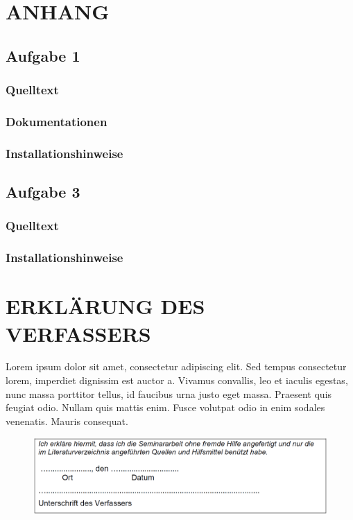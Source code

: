 \documentclass[a4paper,12pt]{article}
\begin{document}
\newpage
\section{ANHANG}
\subsection{Aufgabe 1}
\subsubsection{Quelltext}
\subsubsection{Dokumentationen}
\subsubsection{Installationshinweise}

\subsection{Aufgabe 3}
\subsubsection{Quelltext}
\subsubsection{Installationshinweise}


\newpage
\section{ERKLÄRUNG DES VERFASSERS}



Lorem ipsum dolor sit amet, consectetur adipiscing elit. Sed tempus consectetur lorem, imperdiet dignissim est auctor a. Vivamus convallis, leo et iaculis egestas, nunc massa porttitor tellus, id faucibus urna justo eget massa. Praesent quis feugiat odio. Nullam quis mattis enim. Fusce volutpat odio in enim sodales venenatis. Mauris consequat.

\begin{figure}[H]
    \includegraphics[width=\linewidth]{Bilder/Sonstiges/ErklaerungDesVerfassers.png}
\end{figure}
\end{document}
